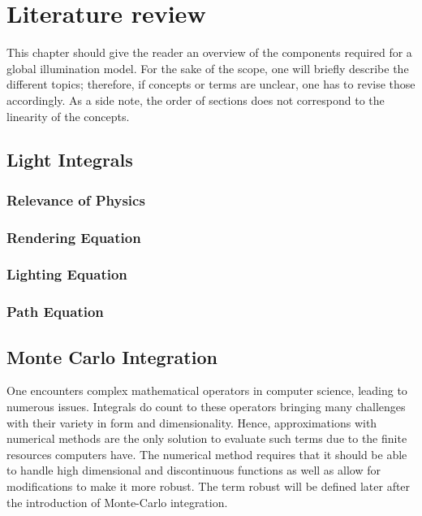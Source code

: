 \chapter{Literature review}

This chapter should give the reader an overview of the components required for a global illumination model.
For the sake of the scope, one will briefly describe the different topics; therefore, if concepts or terms are unclear, one has to revise those accordingly.
As a side note, the order of sections does not correspond to the linearity of the concepts.

\section{Light Integrals}

\subsection{Relevance of Physics}

\subsection{Rendering Equation}

\subsection{Lighting Equation}

\subsection{Path Equation}

\section{Monte Carlo Integration}

One encounters complex mathematical operators in computer science, leading to numerous issues.
Integrals do count to these operators bringing many challenges with their variety in form and dimensionality.
Hence, approximations with numerical methods are the only solution to evaluate such terms due to the finite resources computers have.
The numerical method requires that it should be able to handle high dimensional and discontinuous functions as well as allow for modifications to make it more robust.
\cite{pharr_physically_2017}
The term robust will be defined later after the introduction of  Monte-Carlo integration.

